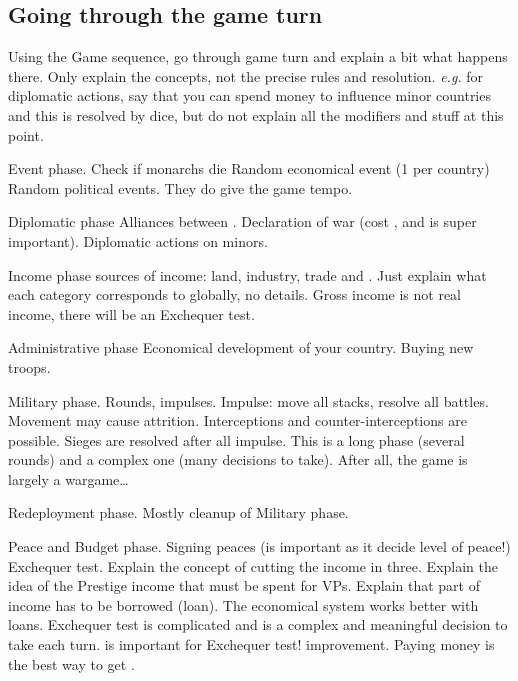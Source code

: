 \subsection{Going through the game turn}
\aparag Using the Game sequence, go through game turn and explain a bit what
happens there.
\bparag Only explain the concepts, not the precise rules and resolution.
\bparag \emph{e.g.} for diplomatic actions, say that you can spend money to
influence minor countries and this is resolved by dice, but do not explain all
the modifiers and stuff at this point.

\aparag Event phase.
\bparag Check if monarchs die
\bparag Random economical event (1 per country)
\bparag Random political events. They do give the game tempo.

\aparag Diplomatic phase
\bparag Alliances between \MAJ.
\bparag Declaration of war (cost \STAB, and \STAB is super important).
\bparag Diplomatic actions on minors.

\aparag Income phase
 sources of income: land, industry, trade and \ROTW.
\bparag Just explain what each category corresponds to globally, no details.
\bparag Gross income is not real income, there will be an Exchequer test.

\aparag Administrative phase
\bparag Economical development of your country.
\bparag Buying new troops.

\aparag Military phase.
\bparag Rounds, impulses.
\bparag Impulse: move all stacks, resolve all battles.
\bparag Movement may cause attrition.
\bparag Interceptions and counter-interceptions are possible.
\bparag Sieges are resolved after all impulse.
\bparag This is a long phase (several rounds) and a complex one (many
decisions to take). After all, the game is largely a wargame\ldots

\aparag Redeployment phase.
\bparag Mostly cleanup of Military phase.

\aparag Peace and Budget phase.
\bparag Signing peaces (\STAB is important as it decide level of peace!)
\bparag Exchequer test.
\bparag Explain the concept of cutting the income in three.
\bparag Explain the idea of the Prestige income that must be spent for VPs.
\bparag Explain that part of income has to be borrowed (loan).
\bparag The economical system works better with loans.
\bparag Exchequer test is complicated and is a complex and meaningful decision
to take each turn.
\bparag \STAB is important for Exchequer test!
\bparag \STAB improvement. Paying money is the best way to get \STAB.

